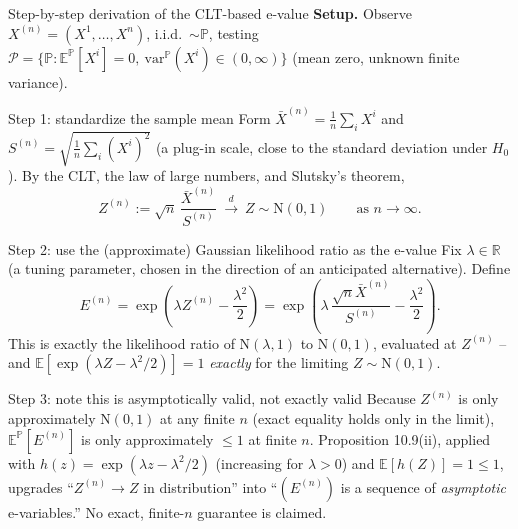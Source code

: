 \documentclass[aspectratio=169,10pt]{beamer}
\newcommand{\R}{\mathbb{R}}
\newcommand{\E}{\mathbb{E}}
\newcommand{\Pb}{\mathbb{P}}
\newcommand{\calP}{\mathcal{P}}
\begin{document}
\begin{frame}{Step-by-step derivation of the CLT-based e-value}
  \textbf{Setup.} Observe $X^{(n)}=(X^1,\dots,X^n)$, i.i.d.\ $\sim\Pb$, testing $\calP=\{\Pb: \E^{\Pb}[X^i]=0,\ \mathrm{var}^{\Pb}(X^i)\in(0,\infty)\}$ (mean zero, unknown finite variance).

  \begin{block}{Step 1: standardize the sample mean}
    Form $\bar X^{(n)} = \frac1n\sum_i X^i$ and $S^{(n)} = \sqrt{\frac1n\sum_i (X^i)^2}$ (a plug-in scale, close to the standard deviation under $H_0$). By the CLT, the law of large numbers, and Slutsky's theorem,
    \[
      Z^{(n)} := \sqrt n\, \frac{\bar X^{(n)}}{S^{(n)}} \ \xrightarrow{\ d\ }\ Z \sim \mathrm{N}(0,1) \qquad \text{as } n\to\infty.
    \]
  \end{block}

  \begin{block}{Step 2: use the (approximate) Gaussian likelihood ratio as the e-value}
    Fix $\lambda\in\R$ (a tuning parameter, chosen in the direction of an anticipated alternative). Define
    \[
      E^{(n)} = \exp\!\left(\lambda Z^{(n)} - \frac{\lambda^2}{2}\right) = \exp\!\left(\lambda\,\frac{\sqrt n \bar X^{(n)}}{S^{(n)}} - \frac{\lambda^2}{2}\right).
    \]
    This is exactly the likelihood ratio of $\mathrm{N}(\lambda,1)$ to $\mathrm{N}(0,1)$, evaluated at $Z^{(n)}$ -- and $\E[\exp(\lambda Z-\lambda^2/2)]=1$ \emph{exactly} for the limiting $Z\sim\mathrm{N}(0,1)$.
  \end{block}

  \begin{block}{Step 3: note this is asymptotically valid, not exactly valid}
    Because $Z^{(n)}$ is only approximately $\mathrm{N}(0,1)$ at any finite $n$ (exact equality holds only in the limit), $\E^{\Pb}[E^{(n)}]$ is only approximately $\leq 1$ at finite $n$. Proposition 10.9(ii), applied with $h(z)=\exp(\lambda z - \lambda^2/2)$ (increasing for $\lambda>0$) and $\E[h(Z)]=1\leq1$, upgrades ``$Z^{(n)}\to Z$ in distribution'' into ``$(E^{(n)})$ is a sequence of \emph{asymptotic} e-variables.'' No exact, finite-$n$ guarantee is claimed.
  \end{block}
\end{frame}
\end{document}
